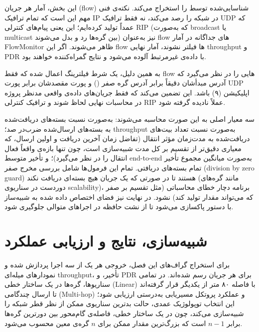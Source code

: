 \documentclass{article}
\begin{document}
	این بخش، آمار هر جریان (flow) شناسایی‌شده توسط  را استخراج می‌کند. نکته‌ی فنی مهم این است که  تمام ترافیک IP در شبکه را رصد می‌کند، نه فقط ترافیک UDP که عمداً تولید کرده‌ایم؛ این یعنی پیام‌های کنترلی RIP (که به‌صورت broadcast یا multicast بین گره‌ها رد و بدل می‌شوند) نیز به‌عنوان flow های جداگانه در آمار FlowMonitor ظاهر می‌شوند. اگر این flow ها فیلتر نشوند، آمار نهایی throughput و PDR با داده‌ی غیرمرتبط آلوده می‌شود و نتایج گمراه‌کننده خواهند بود.
	
	به همین دلیل، یک شرط فیلترینگ اعمال شده که فقط flow هایی را در نظر می‌گیرد که آدرس مبدأشان دقیقاً برابر آدرس گره صفر () و پورت مقصدشان برابر پورت UDP اپلیکیشن (۹) باشد. این تضمین می‌کند که فقط جریان‌های داده‌ی واقعی مدنظر پروژه در محاسبات نهایی لحاظ شوند و ترافیک کنترلی RIP عملاً نادیده گرفته شود.
	
	سه معیار اصلی به این صورت محاسبه می‌شوند:  به‌صورت نسبت بسته‌های دریافت‌شده به بسته‌های ارسال‌شده ضرب‌در صد؛ throughput به‌صورت نسبت تعداد بیت‌های دریافت‌شده به مدت‌زمان مؤثر انتقال (تفاضل زمان آخرین دریافت و اولین ارسال، که معیاری دقیق‌تر از تقسیم بر کل مدت شبیه‌سازی است، چون تنها بازه‌ی واقعاً فعال انتقال را در نظر می‌گیرد)؛ و تأخیر متوسط end-to-end به‌صورت میانگین مجموع تأخیر تمام بسته‌های دریافتی. تمام این فرمول‌ها شامل بررسی مخرج صفر (division by zero guard) هستند تا در صورتی که یک جریان هیچ بسته‌ای دریافت نکند (مانند گره‌های دوردست در سناریوی scalability)، برنامه دچار خطای محاسباتی (مثل تقسیم بر صفر که می‌تواند مقدار  تولید کند) نشود. در نهایت نیز فضای اختصاص داده شده به شبیه‌ساز با دستور  پاکسازی می‌شود تا از نشت حافظه در اجراهای متوالی جلوگیری شود.
	

	\section{شبیه‌سازی، نتایج و ارزیابی عملکرد}
	
	برای استخراج گراف‌های این فصل، خروجی  هر یک از سه اجرا پردازش شده و نمودارهای میله‌ای throughput، تأخیر، و PDR برای هر جریان رسم شده‌اند. در تمامی سناریوها، گره‌ها در یک ساختار خطی (Linear) با فاصله ۸۰ متر از یکدیگر قرار گرفته‌اند تا ارسال چندگامی (Multi-hop) و عملکرد پروتکل مسیریابی به‌درستی ارزیابی شود؛ این انتخاب توپولوژیک عمدی، حالت بدترین سناریوی ممکن از نظر قطر شبکه را شبیه‌سازی می‌کند، چون در یک ساختار خطی، فاصله‌ی گام‌محور بین دورترین گره‌ها برابر $n-1$ است که بزرگ‌ترین مقدار ممکن برای $n$ گره‌ی معین محسوب می‌شود.
	
\end{document}
